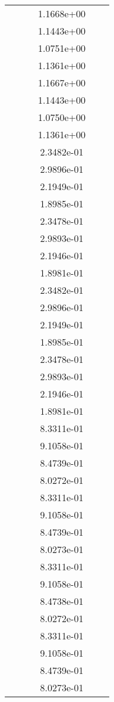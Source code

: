 \begin{xltabular}{\textwidth}{r|rS[table-format=1.3e+2]S[table-format=1.4e+2]S[table-format=1.4e+2]S[table-format=-1.5]}
&  &  & 1.1668e+00 & & \\
&  &  & 1.1443e+00 & & \\
&  &  & 1.0751e+00 & & \\
&  &  & 1.1361e+00 & & \\
&  &  & 1.1667e+00 & & \\
&  &  & 1.1443e+00 & & \\
&  &  & 1.0750e+00 & & \\
&  &  & 1.1361e+00 & & \\
&  &  & 2.3482e-01 & & \\
&  &  & 2.9896e-01 & & \\
&  &  & 2.1949e-01 & & \\
&  &  & 1.8985e-01 & & \\
&  &  & 2.3478e-01 & & \\
&  &  & 2.9893e-01 & & \\
&  &  & 2.1946e-01 & & \\
&  &  & 1.8981e-01 & & \\
&  &  & 2.3482e-01 & & \\
&  &  & 2.9896e-01 & & \\
&  &  & 2.1949e-01 & & \\
&  &  & 1.8985e-01 & & \\
&  &  & 2.3478e-01 & & \\
&  &  & 2.9893e-01 & & \\
&  &  & 2.1946e-01 & & \\
&  &  & 1.8981e-01 & & \\
&  &  & 8.3311e-01 & & \\
&  &  & 9.1058e-01 & & \\
&  &  & 8.4739e-01 & & \\
&  &  & 8.0272e-01 & & \\
&  &  & 8.3311e-01 & & \\
&  &  & 9.1058e-01 & & \\
&  &  & 8.4739e-01 & & \\
&  &  & 8.0273e-01 & & \\
&  &  & 8.3311e-01 & & \\
&  &  & 9.1058e-01 & & \\
&  &  & 8.4738e-01 & & \\
&  &  & 8.0272e-01 & & \\
&  &  & 8.3311e-01 & & \\
&  &  & 9.1058e-01 & & \\
&  &  & 8.4739e-01 & & \\
&  &  & 8.0273e-01 & & \\

\end{xltabular}
